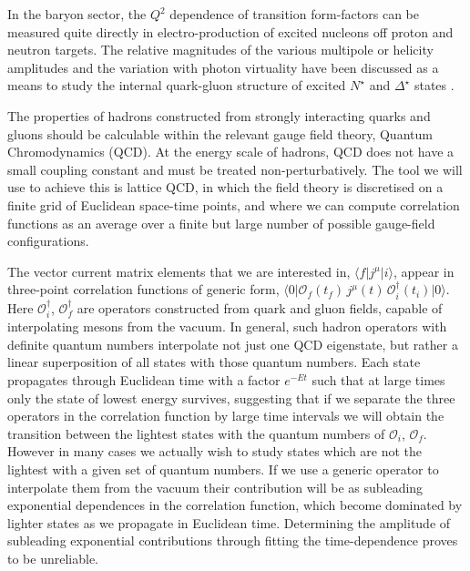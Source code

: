 \documentclass[twocolumn,amsmath,amssymb,prd,10pt,floatfix, 
superscriptaddress,nofootinbib, showpacs, preprintnumbers]{revtex4-1}
\begin{document}
In the baryon sector, the $Q^2$ dependence of transition form-factors can be measured quite directly in electro-production of excited nucleons off proton and neutron targets. The relative magnitudes of the various multipole or helicity amplitudes and the variation with photon virtuality have been discussed as a means to study the internal quark-gluon structure of excited $N^\star$ and $\Delta^\star$ states \cite{Aznauryan:2012ba}. 

The properties of hadrons constructed from strongly interacting quarks and gluons should be calculable within the relevant gauge field theory, Quantum Chromodynamics (QCD). At the energy scale of hadrons, QCD does not have a small coupling constant and must be treated non-perturbatively. The tool we will use to achieve this is lattice QCD, in which the field theory is discretised on a finite grid of Euclidean space-time points, and where we can compute correlation functions as an average over a finite but large number of possible gauge-field configurations. 


The vector current matrix elements that we are interested in, $\big\langle {f} \big| j^\mu \big| {i} \big\rangle$, appear in three-point correlation functions of generic form, $\big\langle 0 \big| \mathcal{O}_{f}(t_f) \, j^\mu(t)\,  \mathcal{O}_{i}^\dag(t_i) \big| 0 \big\rangle$. Here $\mathcal{O}_{i}^\dag$, $\mathcal{O}_{f}^\dag$ are operators constructed from quark and gluon fields, capable of interpolating mesons from the vacuum. In general, such hadron operators with definite quantum numbers interpolate not just one QCD eigenstate, but rather a linear superposition of all states with those quantum numbers. Each state propagates through Euclidean time with a factor $e^{-E t}$ such that at large times only the state of lowest energy survives, suggesting that if we separate the three operators in the correlation function by large time intervals we will obtain the transition between the lightest states with the quantum numbers of $\mathcal{O}_{i}$, $\mathcal{O}_{f}$. However in many cases we actually wish to study states which are not the lightest with a given set of quantum numbers. If we use a generic operator to interpolate them from the vacuum their contribution will be as subleading exponential dependences in the correlation function, which become dominated by lighter states as we propagate in Euclidean time. Determining the amplitude of subleading exponential contributions through fitting the time-dependence proves to be unreliable.
\end{document}
